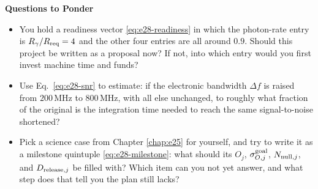 \medskip
\noindent\textbf{Questions to Ponder}
\begin{itemize}
  \item You hold a readiness vector \eqref{eq:e28-readiness} in which the photon-rate entry is \(R_\gamma/R_{\rm req}=4\) and the other four entries are all around \(0.9\). Should this project be written as a proposal now? If not, into which entry would you first invest machine time and funds?
  \item Use Eq.\ \eqref{eq:e28-snr} to estimate: if the electronic bandwidth \(\Delta f\) is raised from \(200\,\mathrm{MHz}\) to \(800\,\mathrm{MHz}\), with all else unchanged, to roughly what fraction of the original is the integration time needed to reach the same signal-to-noise shortened?
  \item Pick a science case from Chapter \ref{chap:e25} for yourself, and try to write it as a milestone quintuple \eqref{eq:e28-milestone}: what should its \(O_j\), \(\sigma_{O,j}^{\rm goal}\), \(N_{{\rm null},j}\), and \(D_{{\rm release},j}\) be filled with? Which item can you not yet answer, and what step does that tell you the plan still lacks?
\end{itemize}
